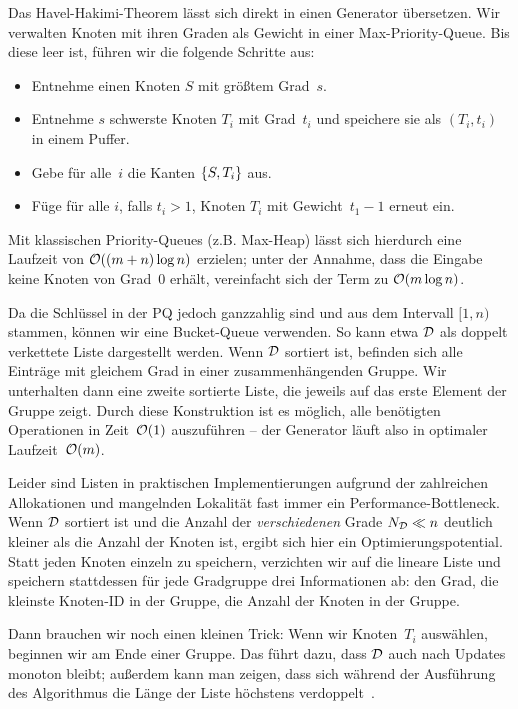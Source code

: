 Das Havel-Hakimi-Theorem lässt sich direkt in einen Generator übersetzen.
Wir verwalten Knoten mit ihren Graden als Gewicht in einer Max-Priority-Queue.
Bis diese leer ist, führen wir die folgende Schritte aus:
\begin{itemize}
    \item Entnehme einen Knoten $S$ mit größtem Grad~$s$.
    \item Entnehme $s$ schwerste Knoten $T_i$ mit Grad~$t_i$ und speichere sie als $(T_i, t_i)$ in einem Puffer.
    \item Gebe für alle~$i$ die Kanten $\left\{S, T_i\right\}$ aus.
    \item Füge für alle $i$, falls $t_i > 1$, Knoten $T_i$ mit Gewicht~$t_1 - 1$ erneut ein.
\end{itemize}

Mit klassischen Priority-Queues (z.B. Max-Heap) lässt sich hierdurch eine Laufzeit von $\mathcal{O}\!\left((m + n) \log n\right)$ erzielen;
unter der Annahme, dass die Eingabe keine Knoten von Grad~0 erhält, vereinfacht sich der Term zu $\mathcal{O}\!\left(m \log n\right)$.

Da die Schlüssel in der PQ jedoch ganzzahlig sind und aus dem Intervall $[1, n)$ stammen, können wir eine Bucket-Queue verwenden.
So kann etwa $\mathcal{D}$ als doppelt verkettete Liste dargestellt werden.
Wenn $\mathcal{D}$ sortiert ist, befinden sich alle Einträge mit gleichem Grad in einer zusammenhängenden Gruppe.
Wir unterhalten dann eine zweite sortierte Liste, die jeweils auf das erste Element der Gruppe zeigt.
Durch diese Konstruktion ist es möglich, alle benötigten Operationen in Zeit~$\mathcal{O}\!\left(1\right)$ auszuführen -- der Generator läuft also in optimaler Laufzeit~$\mathcal{O}\!\left(m\right)$.

Leider sind Listen in praktischen Implementierungen aufgrund der zahlreichen Allokationen und mangelnden Lokalität fast immer ein Performance-Bottleneck.
Wenn $\mathcal{D}$ sortiert ist und die Anzahl der \emph{verschiedenen} Grade $N_{\mathcal{D}} \ll n$ deutlich kleiner als die Anzahl der Knoten ist, ergibt sich hier ein Optimierungspotential.
Statt jeden Knoten einzeln zu speichern, verzichten wir auf die  lineare Liste und speichern stattdessen für jede Gradgruppe drei Informationen ab:
den Grad, die kleinste Knoten-ID in der Gruppe, die Anzahl der Knoten in der Gruppe.

Dann brauchen wir noch einen kleinen Trick: Wenn wir Knoten~$T_i$ auswählen, beginnen wir am Ende einer Gruppe.
Das führt dazu, dass $\mathcal{D}$ auch nach Updates monoton bleibt; außerdem kann man zeigen, dass sich während der Ausführung des Algorithmus die Länge der Liste höchstens verdoppelt~\cite{DBLP:journals/jea/HamannMPTW18}.

